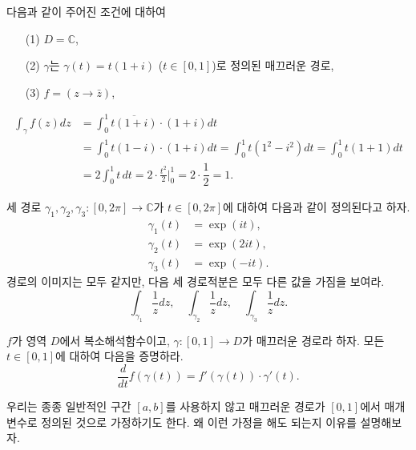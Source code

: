 \begin{saltexample}[label=example-3-2]{}{} %
다음과 같이 주어진 조건에 대하여
\begin{itemize}
\item[(1)] $D=\mathbb C$,
\item[(2)] $\gamma$는 $\gamma(t)= t(1+i)$ ($t\in[0,1]$)로 정의된 매끄러운 경로,
\item[(3)] $f = (z\to \bar z)$,
\end{itemize}
\begin{align*}
\int_\gamma f(z)dz &= \int_0^1 \overline{t(1+i)}\cdot (1+i)dt \\
&= \int_0^1 t(1-i)\cdot(1+i)dt
= \int_0^1 t(1^2-i^2)dt = \int_0^1 t(1+1)dt \\
&= 2\int_0^1 t\,dt = 2\cdot \frac{t^2}2 \Big|_0^1 = 2\cdot \dfrac12 = 1.
\end{align*}
\end{saltexample}

\begin{salt_exercise} \label{ex-3-1}
세 경로 $\gamma_1, \gamma_2, \gamma_3: [0,2\pi] \to \mathbb C$가 
$t\in[0,2\pi]$에 대하여 다음과 같이 정의된다고 하자.
\begin{align*}
\gamma_1(t) &= \exp(it), \\
\gamma_2(t) &= \exp(2it), \\
\gamma_3(t) &= \exp(-it).
\end{align*}
경로의 이미지는 모두 같지만, 다음 세 경로적분은 모두 다른 값을 가짐을 보여라.
\[
\int_{\gamma_1} \dfrac1zdz, \quad
\int_{\gamma_2} \dfrac1zdz, \quad
\int_{\gamma_3} \dfrac1zdz.
\]
\end{salt_exercise}

\begin{salt_exercise} \label{ex-3-2}
$f$가 영역 $D$에서 복소해석함수이고, $\gamma:[0,1]\to D$가 매끄러운 경로라 하자.
모든 $t\in[0,1]$에 대하여 다음을 증명하라.
\[
\dfrac{d}{dt} f(\gamma(t)) = f'(\gamma(t))\cdot \gamma'(t). 
\]
\end{salt_exercise}

우리는 종종 일반적인 구간 $[a,b]$를 사용하지 않고
매끄러운 경로가 $[0,1]$에서 매개변수로 정의된 것으로 가정하기도 한다.
왜 이런 가정을 해도 되는지 이유를 설명해보자.

